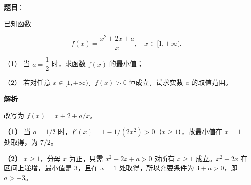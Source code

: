 \begin{answer}

\textbf{题目}：

已知函数

\nopagebreak[4]
\[
f(x)=\dfrac{x^2+2x+a}{x},\quad x\in[1,+\infty).
\]

（1） 当 $a=\dfrac12$ 时，求函数 $f(x)$ 的最小值；

（2） 若对任意 $x\in[1,+\infty)$，$f(x)>0$ 恒成立，试求实数 $a$ 的取值范围。

\textbf{解析}

改写为 $f(x)=x+2+a/x$。

\textbf{（1）} 当 $a=1/2$ 时，$f'(x)=1-1/(2x^2)>0$（$x\geq1$），故最小值在 $x=1$ 处取得，为 $7/2$。

\textbf{（2）} $x\geq1$，分母 $x$ 为正，只需 $x^2+2x+a>0$ 对所有 $x\geq1$ 成立。$x^2+2x$ 在区间上递增，最小值是 $3$，且在 $x=1$ 处取得，所以充要条件为 $3+a>0$，即 $a>-3$。



\end{answer}
